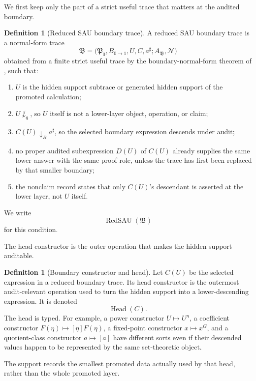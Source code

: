\documentclass[11pt]{article}
\newcommand{\Head}{\operatorname{Head}}
\newcommand{\RedSAU}{\operatorname{RedSAU}}
\theoremstyle{definition}
\newtheorem{definition}[theorem]{Definition}
\begin{document}
We first keep only the part of a strict useful trace that matters at the audited
boundary.

\begin{definition}[Reduced SAU boundary trace]
\label{def:sau-reduced-boundary-trace}
A reduced SAU boundary trace is a normal-form trace
\[
\mathfrak B=\bigl(\mathfrak P_0,B_{0\to1},U,C,a^\sharp;A_{\mathfrak B},\mathcal N\bigr)
\]
obtained from a finite strict useful trace by the boundary-normal-form theorem of , such that:
\begin{enumerate}
\item \(U\) is the hidden support subtrace or generated hidden support of the promoted calculation;
\item \(U\not\downarrow_q\), so \(U\) itself is not a lower-layer object, operation, or claim;
\item \(C(U)\downarrow_B a^\sharp\), so the selected boundary expression descends under audit;
\item no proper audited subexpression \(D(U)\) of \(C(U)\) already supplies the same lower answer with the same proof role, unless the trace has first been replaced by that smaller boundary;
\item the nonclaim record states that only \(C(U)\)'s descendant is asserted at the lower layer, not \(U\) itself.
\end{enumerate}
We write
\[
\RedSAU(\mathfrak B)
\]
for this condition.
\end{definition}

The head constructor is the outer operation that makes the hidden support
auditable.

\begin{definition}[Boundary constructor and head]
\label{def:sau-boundary-head}
Let \(C(U)\) be the selected expression in a reduced boundary trace.  Its head constructor is the outermost audit-relevant operation used to turn the hidden support into a lower-descending expression.  It is denoted
\[
\Head(C).
\]
The head is typed.  For example, a power constructor \(U\mapsto U^n\), a coefficient constructor \(F(\eta)\mapsto[\eta]F(\eta)\), a fixed-point constructor \(x\mapsto x^G\), and a quotient-class constructor \(a\mapsto[a]\) have different sorts even if their descended values happen to be represented by the same set-theoretic object.
\end{definition}

The support records the smallest promoted data actually used by that head, rather
than the whole promoted layer.
\end{document}
